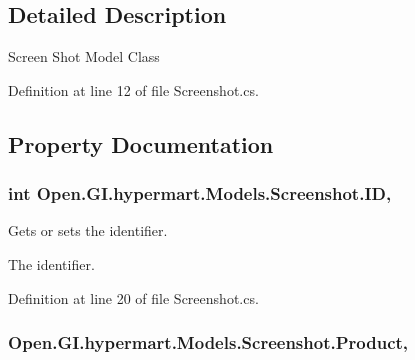 \subsection{Detailed Description}
Screen Shot Model Class 



Definition at line 12 of file Screenshot.\+cs.



\subsection{Property Documentation}
\hypertarget{class_open_1_1_g_i_1_1hypermart_1_1_models_1_1_screenshot_a7460fabffe75a362966595c8b86cdef2}{}
\subsubsection[{I\+D}]{\setlength{\rightskip}{0pt plus 5cm}int Open.\+G\+I.\+hypermart.\+Models.\+Screenshot.\+I\+D\hspace{0.3cm}{\ttfamily [get]}, {\ttfamily [set]}}\label{class_open_1_1_g_i_1_1hypermart_1_1_models_1_1_screenshot_a7460fabffe75a362966595c8b86cdef2}


Gets or sets the identifier. 

The identifier. 

Definition at line 20 of file Screenshot.\+cs.

\hypertarget{class_open_1_1_g_i_1_1hypermart_1_1_models_1_1_screenshot_ae2ce2f5bb22f6d3e20186701015aa355}{}
\subsubsection[{Product}]{ Open.\+G\+I.\+hypermart.\+Models.\+Screenshot.\+Product\hspace{0.3cm}{\ttfamily [get]}, {\ttfamily [set]}}\label{class_open_1_1_g_i_1_1hypermart_1_1_models_1_1_screenshot_ae2ce2f5bb22f6d3e20186701015aa355}


